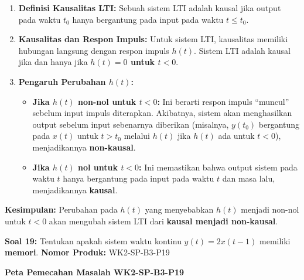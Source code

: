 \documentclass[
  letterpaper,
  DIV=11,
  numbers=noendperiod]{scrreprt}
\providecommand{\tightlist}{%
  \setlength{\itemsep}{0pt}\setlength{\parskip}{0pt}}
\begin{document}
\begin{enumerate}
\def\labelenumi{\arabic{enumi}.}
\tightlist
\item
  \textbf{Definisi Kausalitas LTI:} Sebuah sistem LTI adalah kausal jika
  output pada waktu \(t_0\) hanya bergantung pada input pada waktu
  \(t \le t_0\).
\item
  \textbf{Kausalitas dan Respon Impuls:} Untuk sistem LTI, kausalitas
  memiliki hubungan langsung dengan respon impuls \(h(t)\). Sistem LTI
  adalah kausal jika dan hanya jika \textbf{\(h(t) = 0\) untuk
  \(t < 0\)}.
\item
  \textbf{Pengaruh Perubahan \(h(t)\):}

  \begin{itemize}
  \tightlist
  \item
    \textbf{Jika \(h(t)\) non-nol untuk \(t < 0\):} Ini berarti respon
    impuls ``muncul'' sebelum input impuls diterapkan. Akibatnya, sistem
    akan menghasilkan output sebelum input sebenarnya diberikan
    (misalnya, \(y(t_0)\) bergantung pada \(x(t)\) untuk \(t > t_0\)
    melalui \(h(t)\) jika \(h(t)\) ada untuk \(t < 0\)), menjadikannya
    \textbf{non-kausal}.
  \item
    \textbf{Jika \(h(t)\) nol untuk \(t < 0\):} Ini memastikan bahwa
    output sistem pada waktu \(t\) hanya bergantung pada input pada
    waktu \(t\) dan masa lalu, menjadikannya \textbf{kausal}.
  \end{itemize}
\end{enumerate}

\textbf{Kesimpulan:} Perubahan pada \(h(t)\) yang menyebabkan \(h(t)\)
menjadi non-nol untuk \(t<0\) akan mengubah sistem LTI dari
\textbf{kausal menjadi non-kausal}.

\textbf{Soal 19:} Tentukan apakah sistem waktu kontinu
\(y(t) = 2x(t-1)\) memiliki \textbf{memori}. \textbf{Nomor Produk:}
WK2-SP-B3-P19

\textbf{Peta Pemecahan Masalah WK2-SP-B3-P19}
\end{document}
